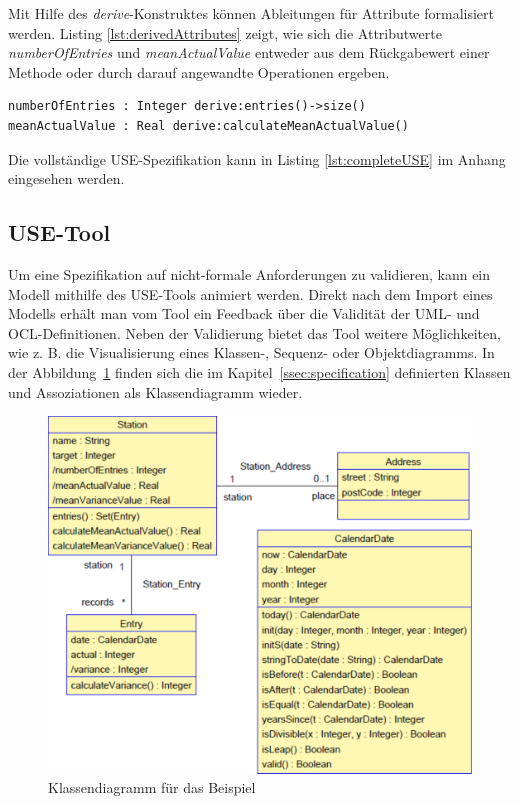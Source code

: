 \documentclass[a4paper,twoside]{article}
\begin{document}
Mit Hilfe des \textit{derive}-Konstruktes können Ableitungen für Attribute formalisiert werden. Listing \ref{lst:derivedAttributes} zeigt, wie sich die Attributwerte \textit{numberOfEntries} und \textit{meanActualValue} entweder aus dem Rückgabewert einer Methode oder durch darauf angewandte Operationen ergeben.
\begin{lstlisting}[caption={Abgeleitete Attribute der Klasse Station},label=lst:derivedAttributes]
numberOfEntries : Integer derive:entries()->size()
meanActualValue : Real derive:calculateMeanActualValue()
\end{lstlisting}

Die vollständige USE-Spezifikation kann in Listing \ref{lst:completeUSE} im Anhang eingesehen werden.
\subsection{USE-Tool}
\label{sec:use_tool}

Um eine Spezifikation auf nicht-formale Anforderungen zu validieren, kann ein Modell mithilfe des USE-Tools animiert werden. Direkt nach dem Import eines Modells erhält man vom Tool ein Feedback über die Validität der UML- und OCL-Definitionen. Neben der Validierung bietet das Tool weitere Möglichkeiten, wie z. B. die Visualisierung eines Klassen-, Sequenz- oder Objektdiagramms. In der Abbildung~\ref{fig:Grafik2} finden sich die im Kapitel~\ref{ssec:specification} definierten Klassen und Assoziationen als Klassendiagramm wieder.

\begin{figure}[!h]
	\includegraphics[scale=.325]{pics/USE_class_diagram_v2.pdf}
	\caption{Klassendiagramm für das Beispiel}
	\label{fig:Grafik2}
\end{figure}
\end{document}
